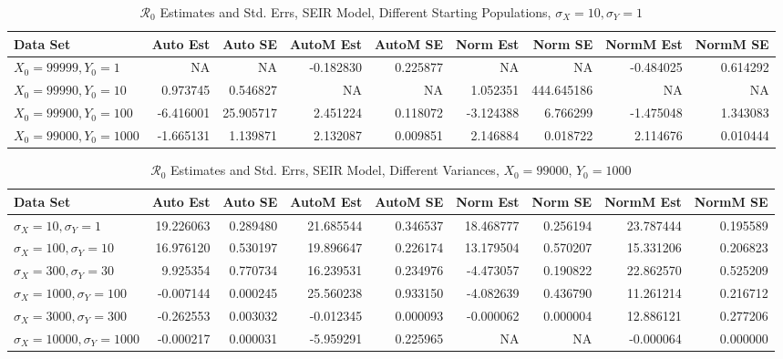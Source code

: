 \documentclass[12pt]{article}
\newcommand{\rr}{\ensuremath{\mathcal{R}_0}}
\begin{document}
\begin{table}[H]
	
	\caption{$\rr$ Estimates and Std. Errs, SEIR Model,
		Different Starting Populations, 
		$\sigma_X = 10, \sigma_Y = 1$}
	\begin{footnotesize}
		\hskip -1.7cm
		\begin{tabular}{l|r|r|r|r|r|r|r|r}
			\hline
			Data Set & Auto Est & Auto SE & AutoM Est & AutoM SE & Norm Est & Norm SE & NormM Est & NormM SE\\
			\hline
			$X_0 = 99999, Y_0 = 1$ & NA & NA & -0.182830 & 0.225877 & NA & NA & -0.484025 & 0.614292\\
			\hline
			$X_0 = 99990, Y_0 = 10$ & 0.973745 & 0.546827 & NA & NA & 1.052351 & 444.645186 & NA & NA\\
			\hline
			$X_0 = 99900, Y_0 = 100$ & -6.416001 & 25.905717 & 2.451224 & 0.118072 & -3.124388 & 6.766299 & -1.475048 & 1.343083\\
			\hline
			$X_0 = 99000, Y_0 = 1000$ & -1.665131 & 1.139871 & 2.132087 & 0.009851 & 2.146884 & 0.018722 & 2.114676 & 0.010444\\
			\hline
		\end{tabular}
	\end{footnotesize}
\end{table}

\begin{table}[H]
	
	
	\caption{$\rr$ Estimates and Std. Errs, SEIR Model, 
		Different Variances, $X_0 = 99000$, $Y_0 = 1000$}
	\begin{footnotesize}
		\hskip -1.7cm
		\begin{tabular}{l|r|r|r|r|r|r|r|r}
			\hline
			Data Set & Auto Est & Auto SE & AutoM Est & AutoM SE & Norm Est & Norm SE & NormM Est & NormM SE\\
			\hline
			$\sigma_X = 10, \sigma_Y = 1$ & 19.226063 & 0.289480 & 21.685544 & 0.346537 & 18.468777 & 0.256194 & 23.787444 & 0.195589\\
			\hline
			$\sigma_X = 100, \sigma_Y = 10$ & 16.976120 & 0.530197 & 19.896647 & 0.226174 & 13.179504 & 0.570207 & 15.331206 & 0.206823\\
			\hline
			$\sigma_X = 300, \sigma_Y = 30$ & 9.925354 & 0.770734 & 16.239531 & 0.234976 & -4.473057 & 0.190822 & 22.862570 & 0.525209\\
			\hline
			$\sigma_X = 1000, \sigma_Y = 100$ & -0.007144 & 0.000245 & 25.560238 & 0.933150 & -4.082639 & 0.436790 & 11.261214 & 0.216712\\
			\hline
			$\sigma_X = 3000, \sigma_Y = 300$ & -0.262553 & 0.003032 & -0.012345 & 0.000093 & -0.000062 & 0.000004 & 12.886121 & 0.277206\\
			\hline
			$\sigma_X = 10000, \sigma_Y = 1000$ & -0.000217 & 0.000031 & -5.959291 & 0.225965 & NA & NA & -0.000064 & 0.000000\\
			\hline
		\end{tabular}
	\end{footnotesize}
\end{table}
\end{document}
